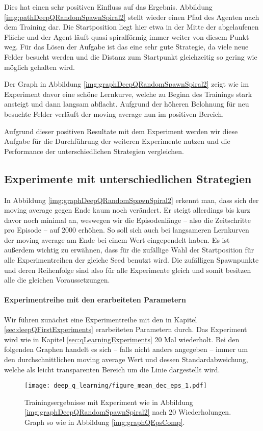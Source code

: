 Dies hat einen sehr positiven Einfluss auf das Ergebnis. Abbildung \ref{img:pathDeepQRandomSpawnSpiral2} stellt wieder einen Pfad des Agenten nach dem Training dar. Die Startposition liegt hier etwa in der Mitte der abgelaufenen Fläche und der Agent läuft quasi spiralförmig immer weiter von diesem Punkt weg. Für das Lösen der Aufgabe ist das eine sehr gute Strategie, da viele neue Felder besucht werden und die Distanz zum Startpunkt gleichzeitig so gering wie möglich gehalten wird.

Der Graph in Abbildung \ref{img:graphDeepQRandomSpawnSpiral2} zeigt wie im Experiment davor eine schöne Lernkurve, welche zu Beginn des Trainings stark ansteigt und dann langsam abflacht. Aufgrund der höheren Belohnung für neu besuchte Felder verläuft der moving average nun im positiven Bereich.

Aufgrund dieser positiven Resultate mit dem Experiment werden wir diese Aufgabe für die Durchführung der weiteren Experimente nutzen und die Performance der unterschiedlichen Strategien vergleichen.

\subsection{Experimente mit unterschiedlichen Strategien}
In Abbildung \ref{img:graphDeepQRandomSpawnSpiral2} erkennt man, dass sich der moving average gegen Ende kaum noch verändert. Er steigt allerdings bis kurz davor noch minimal an, weswegen wir die Episodenlänge -- also die Zeitschritte pro Episode -- auf 2000 erhöhen. So soll sich auch bei langsameren Lernkurven der moving average am Ende bei einem Wert eingependelt haben. Es ist außerdem wichtig zu erwähnen, dass für die zufällige Wahl der Startposition für alle Experimentreihen der gleiche Seed benutzt wird. Die zufälligen Spawnpunkte und deren Reihenfolge sind also für alle Experimente gleich und somit besitzen alle die gleichen Voraussetzungen.

\paragraph{Experimentreihe mit den erarbeiteten Parametern}
Wir führen zunächst eine Experimentreihe mit den in Kapitel \ref{sec:deepQFirstExperiments} erarbeiteten Parametern durch. Das Experiment wird wie in Kapitel \ref{sec:qLearningExperiments} 20 Mal wiederholt. Bei den folgenden Graphen handelt es sich -- falls nicht anders angegeben -- immer um den durchschnittlichen moving average Wert und dessen Standardabweichung, welche als leicht transparenten Bereich um die Linie dargestellt wird.
\begin{figure}[h]
    \centering
    \texttt{[image: deep\_q\_learning/figure\_mean\_dec\_eps\_1.pdf]}
    \caption{Trainingsergebnisse mit Experiment wie in Abbildung \ref{img:graphDeepQRandomSpawnSpiral2} nach 20 Wiederholungen. Graph so wie in Abbildung \ref{img:graphQEpsComp}.} \label{img:graphDeepQMeanDecEps1}

\end{figure}

